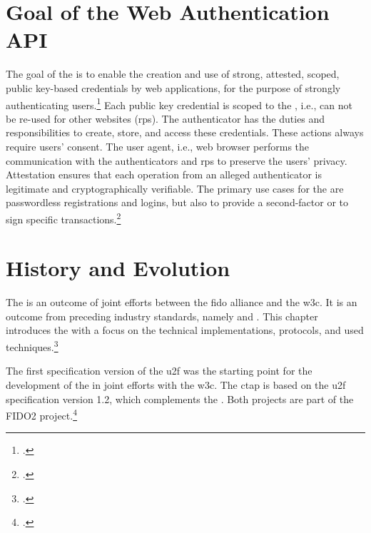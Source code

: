 \section{Goal of the Web Authentication API}

The goal of the \wa{} is to enable \frqq the creation and use of strong, attested, scoped, public key-based credentials by web applications, for the purpose of strongly authenticating users\flqq.\footcites[See][Abstract]{w3c} Each public key credential is scoped to the , i.e., can not be re-used for other websites (\glspl{rp}). The authenticator has the duties and responsibilities to create, store, and access these credentials. These actions always require users' consent. The user agent, i.e., web browser performs the communication with the authenticators and \glspl{rp} to preserve the users' privacy. Attestation ensures that each operation from an alleged authenticator is legitimate and cryptographically verifiable. The primary use cases for the \wa{} are passwordless registrations and logins, but also to provide a second-factor or to sign specific transactions.\footcites[See][Abstract, Chapter 1.2]{w3c}

\section{History and Evolution}

The \wa{} is an outcome of joint efforts between	 the \gls{fido} alliance and the \gls{w3c}. It is an outcome from preceding industry standards, namely  and . This chapter introduces the \wa{} with a focus on the technical implementations, protocols, and used techniques.\footcites[See][24]{fido-ct-3}

The first specification version of the \gls{u2f} was the starting point for the development of the \wa{} in joint efforts with the \gls{w3c}. The \gls{ctap} is based on the \gls{u2f} specification version 1.2, which complements the \wa. Both projects are part of the FIDO2 project.\footcite[See][169--170]{grimes2017hacking}
